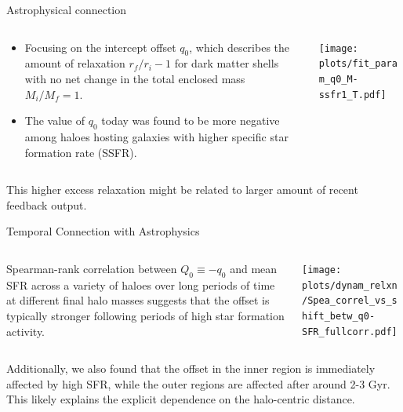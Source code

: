 \documentclass{beamer}
\begin{document}
\begin{frame}{Astrophysical connection}
    \begin{columns}
        \begin{column}{0.5\linewidth}
            \begin{itemize}
                \item Focusing on the intercept offset $q_0$, which describes the amount of relaxation $r_f/r_i-1$ for dark matter shells with no net change in the total enclosed mass $M_i/M_f=1$.
                \item The value of $q_0$ today was found to be more negative among haloes hosting galaxies with higher specific star formation rate (SSFR).
            \end{itemize}
        \end{column}
        \begin{column}{0.49\linewidth}
            \begin{center}
                \texttt{[image: plots/fit\_param\_q0\_M-ssfr1\_T.pdf]}
            \end{center}
        \end{column}
    \end{columns} 
    \begin{block}{}
        This higher excess relaxation might be related to larger amount of recent feedback output.
    \end{block}
\end{frame}

\begin{frame}{Temporal Connection with Astrophysics}
    \begin{columns}
        \begin{column}{0.45\linewidth}
            Spearman-rank correlation between $Q_0 \equiv -q_0$ and mean SFR across a variety of haloes over long periods of time at different final halo masses suggests that the offset is typically stronger following periods of high star formation activity.
        \end{column}
        \begin{column}{0.55\linewidth}
            \begin{center}
                \texttt{[image: plots/dynam\_relxn/Spea\_correl\_vs\_shift\_betw\_q0-SFR\_fullcorr.pdf]}
            \end{center}
        \end{column}
    \end{columns} 
    \pause
    Additionally, we also found that the offset in the inner region is immediately affected by high SFR, while the outer regions are affected after around 2-3 Gyr. This likely explains the explicit dependence on the halo-centric distance.    
\end{frame}
\end{document}
